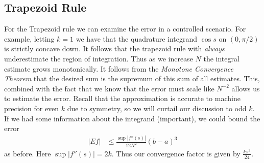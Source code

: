 \documentclass[10pt]{article}
\begin{document}
\subsection*{Trapezoid Rule}
For the Trapezoid rule we can examine the error in a controlled scenario. For example, letting $k = 1$ we have that the quadrature integrand $\cos s$ on $(0, \pi/2)$ is strictly concave down. It follows that the trapezoid rule with \textit{always} underestimate the region of integration. Thus as we increase $N$ the integral estimate grows monotonically. It follows from the \textit{Monotone Convergence Theorem} that the desired sum is the supremum of this sum of all estimates. This, combined with the fact that we know that the error must scale like $N^{-2}$ allows us to estimate the error. Recall that the approximation is accurate to machine precision for even $k$ due to symmetry, so we will curtail our discussion to odd $k$. If we had some information about the integrand (important), we could bound the error
\begin{align*}
    |Ef| &\leq \frac{\sup |f''(s)|}{12N^2}(b - a)^3
\end{align*}
as before. Here $\sup |f''(s)| = 2k$. Thus our convergence factor is given by $\frac{k\pi^3}{24}$.
\end{document}
